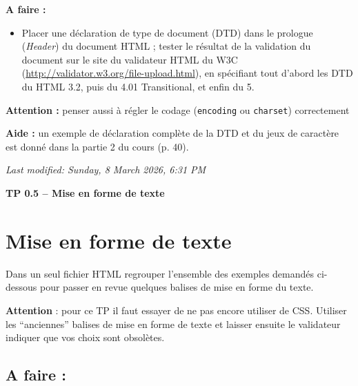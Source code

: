 \documentclass[11pt]{article}
\begin{document}
\begin{afaire}
\textbf{A faire :}

\begin{itemize}
    \item Placer une déclaration de type de document (DTD) dans le prologue (\textit{Header}) du document HTML ; tester le résultat de la validation du document sur le site du validateur HTML du W3C (\url{http://validator.w3.org/file-upload.html}), en spécifiant tout d'abord les DTD du HTML 3.2, puis du 4.01 Transitional, et enfin du 5.
\end{itemize}
\end{afaire}

\textcolor{rougetitre}{\textbf{Attention :}} penser aussi à régler le codage (\texttt{encoding} ou \texttt{charset}) correctement

\textcolor{rougetitre}{\textbf{Aide :}} un exemple de déclaration complète de la DTD et du jeux de caractère est donné dans la partie 2 du cours (p. 40).

\vspace{1em}
\noindent\textit{Last modified: Sunday, 8 March 2026, 6:31 PM}

\newpage
{}

{\Large\bfseries TP 0.5 -- Mise en forme de texte}

\bigskip

\section{Mise en forme de texte}

Dans un seul fichier HTML regrouper l'ensemble des exemples demandés ci-dessous pour passer en revue quelques balises de mise en forme du texte.

\textcolor{rougetitre}{\textbf{Attention}} : pour ce TP il faut essayer de ne pas encore utiliser de CSS. Utiliser les ``anciennes'' balises de mise en forme de texte et laisser ensuite le validateur indiquer que vos choix sont obsolètes.

\subsection{A faire :}
\end{document}
